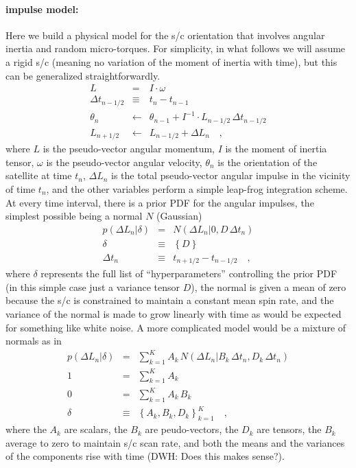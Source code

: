 \documentclass[12pt]{article}
\begin{document}
\paragraph{impulse model:}
Here we build a physical model for the s/c orientation that involves
angular inertia and random micro-torques.  For simplicity, in what
follows we will assume a rigid s/c (meaning no variation of the moment
of inertia with time), but this can be generalized straightforwardly.
\begin{eqnarray}\displaystyle
L &=& I \cdot \omega
\\
\Delta t_{n-1/2} &\equiv& t_n - t_{n-1}
\\
\theta_n &\leftarrow& \theta_{n-1} + I^{-1}\cdot L_{n-1/2}\,\Delta t_{n-1/2}
\\
L_{n+1/2} &\leftarrow& L_{n-1/2} + \Delta L_n
\quad ,
\end{eqnarray}
where $L$ is the pseudo-vector angular momentum, $I$ is the moment of
inertia tensor, $\omega$ is the pseudo-vector angular velocity,
$\theta_n$ is the orientation of the satellite at time $t_n$, $\Delta
L_n$ is the total pseudo-vector angular impulse in the vicinity of
time $t_n$, and the other variables perform a simple leap-frog
integration scheme.  At every time interval, there is a prior PDF for
the angular impulses, the simplest possible being a normal $N$
(Gaussian)
\begin{eqnarray}\displaystyle
p(\Delta L_n|\delta) &=& N(\Delta L_n|0,D\,\Delta t_n)
\\
\delta &\equiv& \left\{D\right\}
\\
\Delta t_n &\equiv& t_{n+1/2} - t_{n-1/2}
\quad ,
\end{eqnarray}
where $\delta$ represents the full list of ``hyperparameters''
controlling the prior PDF (in this simple case just a variance tensor
$D$), the normal is given a mean of zero because the s/c is
constrained to maintain a constant mean spin rate, and the variance of
the normal is made to grow linearly with time as would be expected for
something like white noise.  A more complicated model would be a
mixture of normals as in
\begin{eqnarray}\displaystyle
p(\Delta L_n|\delta) &=& \sum_{k=1}^K A_k\,N(\Delta L_n|B_k\,\Delta t_n, D_k\,\Delta t_n)
\\
1 &=& \sum_{k=1}^K A_k
\\
0 &=& \sum_{k=1}^K A_k\,B_k
\\
\delta &\equiv& \left\{A_k, B_k, D_k\right\}_{k=1}^{K}
\quad ,
\end{eqnarray}
where the $A_k$ are scalars, the $B_k$ are peudo-vectors, the $D_k$
are tensors, the $B_k$ average to zero to maintain s/c scan rate, and
both the means and the variances of the components rise with time
(DWH: Does this makes sense?).
\end{document}
